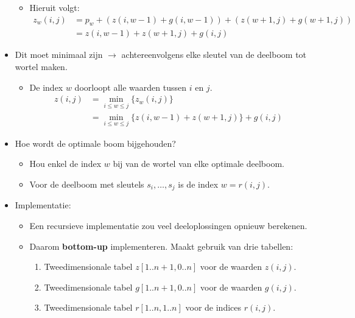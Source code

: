 \begin{itemize}
\begin{itemize}
        \item Hieruit volgt:
        \begin{align*}
            z_w(i, j) & = p_w + (z(i, w - 1) + g(i, w - 1)) + (z(w + 1, j) + g(w + 1, j)) \\
                      & = z(i , w - 1) + z(w + 1, j) + g(i, j)
        \end{align*}
    \end{itemize}
    \item Dit moet minimaal zijn $\rightarrow$ achtereenvolgens elke sleutel van de deelboom tot wortel maken.
    \begin{itemize}
        \item De index $w$ doorloopt alle waarden tussen $i$ en $j$.
        \begin{align*}
            z(i, j) & = \min_{i \leq w \leq j} \{ z_w(i, j)\} \\
                    & = \min_{i \leq w \leq j} \{ z(i , w - 1) + z(w + 1, j)\}  + g(i, j)
        \end{align*}
    \end{itemize}
    \item Hoe wordt de optimale boom bijgehouden?
    \begin{itemize}
        \item Hou enkel de index $w$ bij van de wortel van elke optimale deelboom.
        \item Voor de deelboom met sleutels $s_i, \dots, s_j$ is  de index $w = r(i, j)$.
    \end{itemize}
    \item Implementatie:
    \begin{itemize}
        \item Een recursieve implementatie zou veel deeloplossingen opnieuw berekenen.
        \item Daarom \textbf{bottom-up} implementeren. Maakt gebruik van drie tabellen:
        \begin{enumerate}
            \item Tweedimensionale tabel $z[1..n + 1, 0..n]$ voor de waarden $z(i, j)$.
            \item Tweedimensionale tabel $g[1..n + 1, 0..n]$ voor de waarden $g(i, j)$.
            \item Tweedimensionale tabel $r[1..n, 1..n]$ voor de indices $r(i, j)$.
            

\end{enumerate}
\end{itemize}
\end{itemize}
